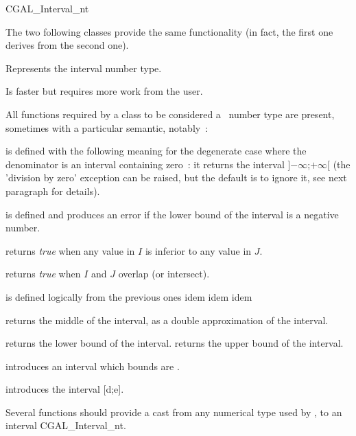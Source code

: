 \documentclass{book}
\begin{document}
\begin{ccClass} {CGAL_Interval_nt}


\ccTypes

The two following classes provide the same functionality (in fact, the
first one derives from the second one).

 {Represents the interval number type.}

 {Is faster but requires more work
from the user.}

All functions required by a class to be considered a \cgal\ number type are
present, sometimes with a particular semantic, notably~:


 {is defined with the
following meaning for the degenerate case where the denominator is an interval
containing zero~: it returns the interval ]$-\infty$;$+\infty$[ (the 'division
by zero' exception can be raised, but the default is to ignore it, see next
paragraph for details).}

 {is defined and
produces an error if the lower bound of the interval is a negative number.}

 {returns {\it true} when any
value in $I$ is inferior to any value in $J$.}

 {returns {\it true} when $I$
and $J$ overlap (or intersect).}

 {is defined logically from the
previous ones}
 {idem}
 {idem}
 {idem}

 {returns the
middle of the interval, as a double approximation of the interval.}

 {returns the lower bound of the interval.}
 {returns the upper bound of the interval.}

\smallskip

\ccCreation

 {introduces an interval
which bounds are .}

{introduces the interval [d;e].}

Several functions should provide a cast from any numerical type used by \cgal,
to an interval CGAL\_Interval\_nt.

\end{ccClass}
\end{document}
